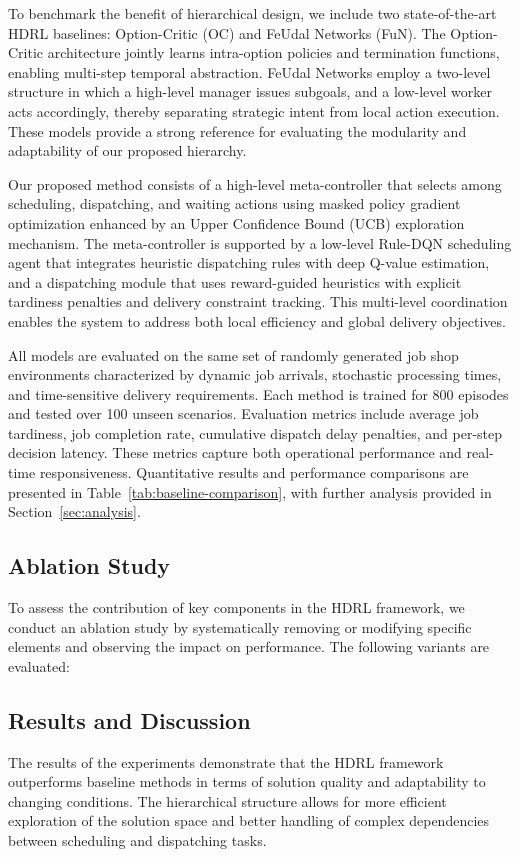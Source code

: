 \documentclass{article}
\begin{document}
To benchmark the benefit of hierarchical design, we include two state-of-the-art HDRL baselines: Option-Critic (OC) and FeUdal Networks (FuN). The Option-Critic architecture jointly learns intra-option policies and termination functions, enabling multi-step temporal abstraction. FeUdal Networks employ a two-level structure in which a high-level manager issues subgoals, and a low-level worker acts accordingly, thereby separating strategic intent from local action execution. These models provide a strong reference for evaluating the modularity and adaptability of our proposed hierarchy.

Our proposed method consists of a high-level meta-controller that selects among scheduling, dispatching, and waiting actions using masked policy gradient optimization enhanced by an Upper Confidence Bound (UCB) exploration mechanism. The meta-controller is supported by a low-level Rule-DQN scheduling agent that integrates heuristic dispatching rules with deep Q-value estimation, and a dispatching module that uses reward-guided heuristics with explicit tardiness penalties and delivery constraint tracking. This multi-level coordination enables the system to address both local efficiency and global delivery objectives.

All models are evaluated on the same set of randomly generated job shop environments characterized by dynamic job arrivals, stochastic processing times, and time-sensitive delivery requirements. Each method is trained for 800 episodes and tested over 100 unseen scenarios. Evaluation metrics include average job tardiness, job completion rate, cumulative dispatch delay penalties, and per-step decision latency. These metrics capture both operational performance and real-time responsiveness. Quantitative results and performance comparisons are presented in Table~\ref{tab:baseline-comparison}, with further analysis provided in Section~\ref{sec:analysis}.

\subsection{Ablation Study}
To assess the contribution of key components in the HDRL framework, we conduct an ablation study by systematically removing or modifying specific elements and observing the impact on performance. The following variants are evaluated:

\subsection{Results and Discussion}
The results of the experiments demonstrate that the HDRL framework outperforms baseline methods in terms of solution quality and adaptability to changing conditions. The hierarchical structure allows for more efficient exploration of the solution space and better handling of complex dependencies between scheduling and dispatching tasks.  
\end{document}
